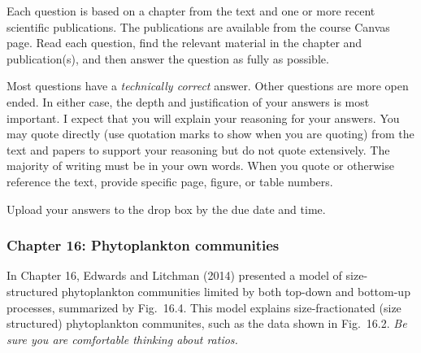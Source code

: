 \documentclass[12pt, addpoints]{exam}
\begin{document}
Each question is based on a chapter from the text and one or more recent scientific publications. 
The publications are available from the course Canvas page. Read each question, find the 
relevant material in the chapter and publication(s), and then answer the 
question as fully as possible.

Most questions have a \emph{technically correct} answer. Other questions
are more open ended. In either case, the depth and justification of your 
answers is most important. I expect that you will explain your reasoning 
for your answers. You may quote directly (use quotation marks to  show when you are quoting) from the text and papers to 
support your reasoning but do not quote extensively. The majority of writing must be in
your own words. When you quote or otherwise reference the text, provide specific page, figure, or table numbers.

Upload your answers to the drop box by the due date and time.

\subsubsection*{Chapter 16: Phytoplankton communities}

In Chapter 16, Edwards and Litchman (2014) presented a model of 
size-structured phytoplankton communities limited by both top-down
and bottom-up processes, summarized by Fig.~16.4. This model 
explains size-fractionated (size structured) phytoplankton
communites, such as the data shown in Fig.~16.2. \emph{Be sure you are comfortable thinking about ratios.}
\end{document}

